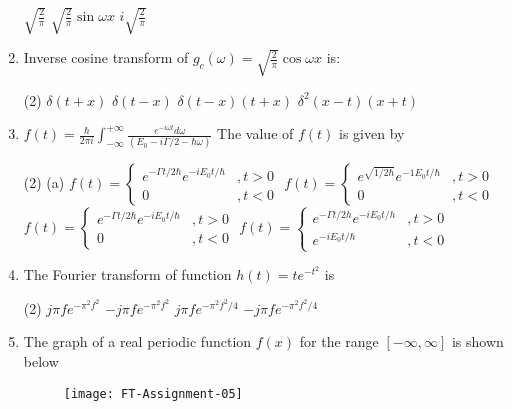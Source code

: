 \begin{enumerate}
\begin{tasks}
		\task[\textbf{b.}]$\sqrt{\frac{2}{\pi}}$
		\task[\textbf{c.}]$\sqrt{\frac{2}{\pi}} \sin \omega x$
		\task[\textbf{d.}] $i \sqrt{\frac{2}{\pi}}$
	\end{tasks}
	\item Inverse cosine transform of $g_{c}(\omega)=\sqrt{\frac{2}{\pi}} \cos \omega x$ is:
	 \begin{tasks}(2)
		\task[\textbf{a.}]$\delta(t+x)$
		\task[\textbf{b.}]$\delta(t-x)$
		\task[\textbf{c.}]$\delta(t-x)(t+x)$
		\task[\textbf{d.}] $\delta^{2}(x-t)(x+t)$
	\end{tasks}
	\item $f(t)=\frac{\hbar}{2 \pi i} \int_{-\infty}^{+\infty} \frac{e^{-i \omega t} d \omega}{\left(E_{0}-i \Gamma / 2-\hbar \omega\right)}$ The value of $f(t)$ is given by
	 \begin{tasks}(2)
		\task[\textbf{a.}](a) $f(t)= \begin{cases}e^{-\Gamma t / 2 \hbar} e^{-i E_{0} t / \hbar} & , t>0 \\ 0 & , t<0\end{cases}$
		\task[\textbf{b.}]$f(t)= \begin{cases}e^{\sqrt{1 / 2 \hbar}} e^{-1 E_{0} t / \hbar} & , t>0 \\ 0 & , t<0\end{cases}$
		\task[\textbf{c.}]$f(t)= \begin{cases}e^{-\Gamma t / 2 \hbar} e^{-i E_{0} t / \hbar} & , t>0 \\ 0 & , t<0\end{cases}$
		\task[\textbf{d.}] $f(t)= \begin{cases}e^{-\Gamma t / 2 h} e^{-i E_{0} t / h} & , t>0 \\ e^{-i E_{0} t / \hbar} & , t<0\end{cases}$
	\end{tasks}
	\item The Fourier transform of function $h(t)=t e^{-t^{2}}$ is 
	 \begin{tasks}(2)
		\task[\textbf{a.}] $j \pi f e^{-\pi^{2} f^{2}}$
		\task[\textbf{b.}]$-j \pi f e^{-\pi^{2} f^{2}}$
		\task[\textbf{c.}]$j \pi f e^{-\pi^{2} f^{2} / 4}$
		\task[\textbf{d.}] $-j \pi f e^{-\pi^{2} f^{2} / 4}$
	\end{tasks}
	\item The graph of a real periodic function $f(x)$ for the range $[-\infty, \infty]$ is shown below
	\begin{figure}[H]
		\centering
		\texttt{[image: FT-Assignment-05]}
	\end{figure}

\end{enumerate}
